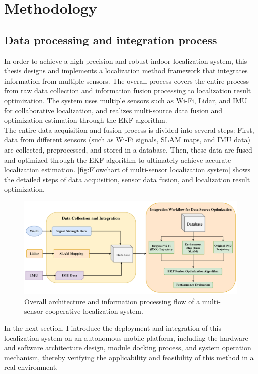 \documentclass[12pt,a4paper]{article}
\numberwithin{equation}{section}
\begin{document}
\section{Methodology}
\subsection{Data processing and integration process}
In order to achieve a high-precision and robust indoor localization system, this thesis designs and implements a localization method framework that integrates information from multiple sensors. The overall process covers the entire process from raw data collection and information fusion processing to localization result optimization. The system uses multiple sensors such as Wi-Fi, Lidar, and IMU for collaborative localization, and realizes multi-source data fusion and optimization estimation through the EKF algorithm.\\
The entire data acquisition and fusion process is divided into several steps: First, data from different sensors (such as Wi-Fi signals, SLAM maps, and IMU data) are collected, preprocessed, and stored in a database. Then, these data are fused and optimized through the EKF algorithm to ultimately achieve accurate localization estimation. \autoref{fig:Flowchart of multi-sensor localization system} shows the detailed steps of data acquisition, sensor data fusion, and localization result optimization.
\begin{figure}[H]
    \centering
    \includegraphics[width=\linewidth]{images/Overview_plus.png}
    \caption{Overall architecture and information processing flow of a multi-sensor cooperative localization system.}
    \label{fig:Flowchart of multi-sensor localization system}
\end{figure}
\noindent In the next section, I introduce the deployment and integration of this localization system on an autonomous mobile platform, including the hardware and software architecture design, module docking process, and system operation mechanism, thereby verifying the applicability and feasibility of this method in a real environment.
\end{document}

